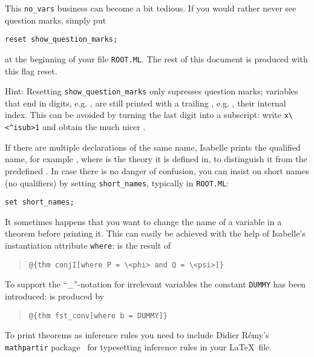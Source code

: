 \begin{isabellebody}
\begin{isamarkuptext}
This \verb!no_vars! business can become a bit tedious.
If you would rather never see question marks, simply put
\begin{verbatim}
reset show_question_marks;
\end{verbatim}
at the beginning of your file \texttt{ROOT.ML}.
The rest of this document is produced with this flag reset.

Hint: Resetting \verb!show_question_marks! only supresses question
marks; variables that end in digits, e.g. , are still
printed with a trailing , e.g. , their
internal index. This can be avoided by turning the last digit into a
subscript: write \verb!x\<^isub>1! and obtain the much nicer .%
\end{isamarkuptext}%
\isamarkuptrue%
%
\isadelimML
%
\endisadelimML
%
\isatagML
%
\endisatagML
{\isafoldML}%
%
\isadelimML
%
\endisadelimML
%
\isamarkuptrue%
%
\begin{isamarkuptext}%
If there are multiple declarations of the same name, Isabelle prints
the qualified name, for example , where  is the
theory it is defined in, to distinguish it from the predefined . In case there is no danger of confusion, you can insist on
short names (no qualifiers) by setting \verb!short_names!, typically
in \texttt{ROOT.ML}:
\begin{verbatim}
set short_names;
\end{verbatim}%
\end{isamarkuptext}%
\isamarkuptrue%
%
\isamarkuptrue%
%
\begin{isamarkuptext}%
It sometimes happens that you want to change the name of a
variable in a theorem before printing it. This can easily be achieved
with the help of Isabelle's instantiation attribute \texttt{where}:
\isa{{\isasymlbrakk}{\isasymphi}{\isacharsemicolon}\ {\isasympsi}{\isasymrbrakk}\ {\isasymLongrightarrow}\ {\isasymphi}\ {\isasymand}\ {\isasympsi}} is the result of
\begin{quote}
\verb!@!\verb!{thm conjI[where P = \<phi> and Q = \<psi>]}!
\end{quote}
To support the ``\_''-notation for irrelevant variables
the constant \texttt{DUMMY} has been introduced:
 is produced by
\begin{quote}
\verb!@!\verb!{thm fst_conv[where b = DUMMY]}!
\end{quote}%
\end{isamarkuptext}%
\isamarkuptrue%
%
\isamarkuptrue%
%
\begin{isamarkuptext}%
To print theorems as inference rules you need to include Didier
R\'emy's \texttt{mathpartir} package~\cite{mathpartir}
for typesetting inference rules in your \LaTeX\ file.


\end{isamarkuptext}
\end{isabellebody}
